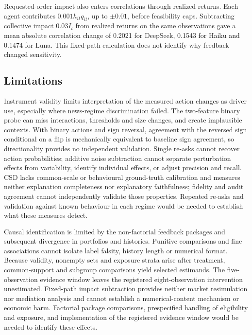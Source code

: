 \documentclass[futureinternet,article,submit,moreauthors,pdftex]{Definitions/mdpi}
\begin{document}
Requested-order impact also enters correlations through realized returns. Each agent contributes $0.001h_{it}q_{it}$, up to $\pm0.01$, before feasibility caps. Subtracting collective impact $0.03I_t$ from realized returns on the same observations gave a mean absolute correlation change of 0.2021 for DeepSeek, 0.1543 for Haiku and 0.1474 for Luna. This fixed-path calculation does not identify why feedback changed sensitivity.

\subsection{Limitations}\label{sec:limitations}
Instrument validity limits interpretation of the measured action changes as driver use, especially where news-regime discrimination failed. The two-feature binary probe can miss interactions, thresholds and size changes, and create implausible contexts. With binary actions and sign reversal, agreement with the reversed sign conditional on a flip is mechanically equivalent to baseline sign agreement, so directionality provides no independent validation. Single re-asks cannot recover action probabilities; additive noise subtraction cannot separate perturbation effects from variability, identify individual effects, or adjust precision and recall. CSD lacks common-scale or behavioural ground-truth calibration and measures neither explanation completeness nor explanatory faithfulness; fidelity and audit agreement cannot independently validate those properties. Repeated re-asks and validation against known behaviour in each regime would be needed to establish what these measures detect.

Causal identification is limited by the non-factorial feedback packages and subsequent divergence in portfolios and histories. Punitive comparisons and fine associations cannot isolate label falsity, history length or numerical format. Because validity, nonempty sets and exposure strata arise after treatment, common-support and subgroup comparisons yield selected estimands. The five-observation evidence window leaves the registered eight-observation intervention unestimated. Fixed-path impact subtraction provides neither market resimulation nor mediation analysis and cannot establish a numerical-content mechanism or economic harm. Factorial package comparisons, prespecified handling of eligibility and exposure, and implementation of the registered evidence window would be needed to identify these effects.
\end{document}
